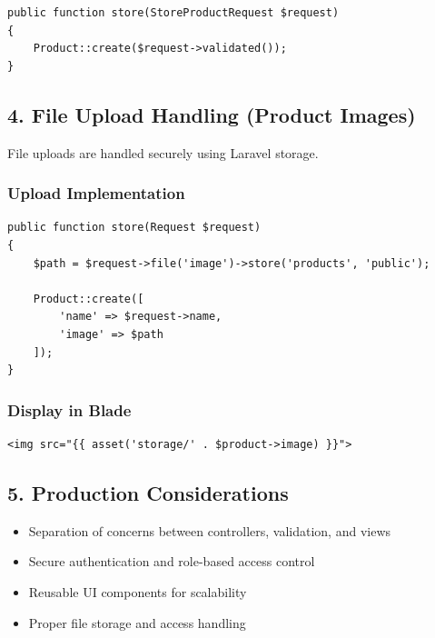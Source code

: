 \documentclass[12pt,a4paper]{article}
\begin{document}
\begin{verbatim}
public function store(StoreProductRequest $request)
{
    Product::create($request->validated());
}
\end{verbatim}

\subsection{4. File Upload Handling (Product Images)}

File uploads are handled securely using Laravel storage.

\subsubsection{Upload Implementation}

\begin{verbatim}
public function store(Request $request)
{
    $path = $request->file('image')->store('products', 'public');

    Product::create([
        'name' => $request->name,
        'image' => $path
    ]);
}
\end{verbatim}

\subsubsection{Display in Blade}

\begin{verbatim}
<img src="{{ asset('storage/' . $product->image) }}">
\end{verbatim}

\subsection{5. Production Considerations}

\begin{itemize}[noitemsep]
    \item Separation of concerns between controllers, validation, and views
    \item Secure authentication and role-based access control
    \item Reusable UI components for scalability
    \item Proper file storage and access handling
\end{itemize}

\end{document}
